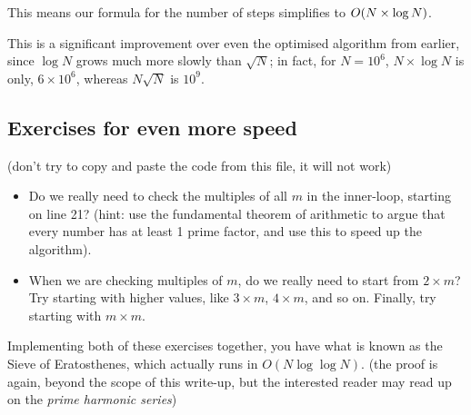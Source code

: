 \documentclass{article}
\DeclarePairedDelimiter{\braces}{(}{)}
\begin{document}
This means our formula for the number of steps simplifies to $O\braces*{N \times\log N}$.

This is a significant improvement over even the optimised algorithm from earlier, since 
$\log N$ grows much more slowly than $\sqrt{N}$;
in fact, for $N = 10^6$, $N \times\log N$ is only, $6 \times 10^6$, whereas
$N \sqrt{N}$ is $10^9$.

\subsection{Exercises for even more speed}
(don't try to copy and paste the code from this file, it will not work)
\begin{itemize}
	\item
		Do we really need to check the multiples of all $m$ in the inner-loop, starting
		on line 21? (hint: use the fundamental theorem of arithmetic to argue that
		every number has at least 1 prime factor, and use this to speed up the algorithm).
	\item 
		When we are checking multiples of $m$, do we really need to start from $2 \times m$?
		Try starting with higher values, like $3 \times m$, $4 \times m$, and so on.
		Finally, try starting with $m \times m$.
\end{itemize}

Implementing both of these exercises together, you have what is known as the Sieve of Eratosthenes,
which actually runs in $O(N \log \log N)$. (the proof is again, beyond the scope of this write-up,
but the interested reader may read up on the \emph{prime harmonic series})
\end{document}
